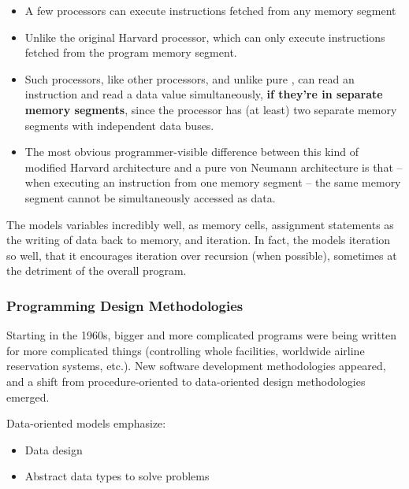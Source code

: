 \begin{definition}
\begin{remark}
\begin{itemize}[noitemsep]
      \begin{itemize}[noitemsep]
      \item A few  processors can execute instructions fetched from any memory segment
      \item Unlike the original Harvard processor, which can only execute instructions fetched from the program memory segment.
      \item Such processors, like other  processors, and unlike pure , can read an instruction and read a data value simultaneously, \textbf{if they're in separate memory segments}, since the processor has (at least) two separate memory segments with independent data buses.
      \item The most obvious programmer-visible difference between this kind of modified Harvard architecture and a pure von Neumann architecture is that – when executing an instruction from one memory segment – the same memory segment cannot be simultaneously accessed as data.
      \end{itemize}
    \end{itemize}
  \end{remark}
\end{definition}

The  models variables incredibly well, as memory cells, assignment statements as the writing of data back to memory, and iteration.
In fact, the  models iteration so well, that it encourages iteration over recursion (when possible), sometimes at the detriment of the overall program.

\subsubsection{Programming Design Methodologies}\label{subsubsec:Programming_Design_Methodologies}
Starting in the 1960s, bigger and more complicated programs were being written for more complicated things (controlling whole facilities, worldwide airline reservation systems, etc.).
New software development methodologies appeared, and a shift from procedure-oriented to data-oriented design methodologies emerged.

Data-oriented models emphasize:
\begin{itemize}[noitemsep]
\item Data design
\item Abstract data types to solve problems
\end{itemize}

